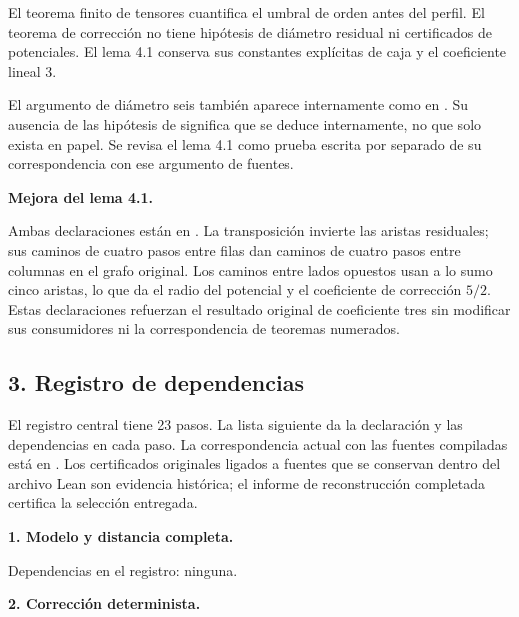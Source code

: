 \documentclass[spanish,11pt,a4paper]{article}
\begin{document}
El teorema finito de tensores cuantifica el umbral de orden antes del perfil. El teorema de corrección no tiene hipótesis de diámetro residual ni certificados de potenciales. El lema 4.1 conserva sus constantes explícitas de caja y el coeficiente lineal 3.

El argumento de diámetro seis también aparece internamente como  en . Su ausencia de las hipótesis de  significa que se deduce internamente, no que solo exista en papel. Se revisa el lema 4.1 como prueba escrita por separado de su correspondencia con ese argumento de fuentes.

\textbf{Mejora del lema 4.1.}



Ambas declaraciones están en . La transposición invierte las aristas residuales; sus caminos de cuatro pasos entre filas dan caminos de cuatro pasos entre columnas en el grafo original. Los caminos entre lados opuestos usan a lo sumo cinco aristas, lo que da el radio del potencial y el coeficiente de corrección \(5/2\). Estas declaraciones refuerzan el resultado original de coeficiente tres sin modificar sus consumidores ni la correspondencia de teoremas numerados.

\subsection{3. Registro de dependencias}\label{registro-de-dependencias}

El registro central tiene 23 pasos. La lista siguiente da la declaración y las dependencias en cada paso. La correspondencia actual con las fuentes compiladas está en . Los certificados originales ligados a fuentes que se conservan dentro del archivo Lean son evidencia histórica; el informe de reconstrucción completada certifica la selección entregada.

\textbf{1. Modelo y distancia completa.}


Dependencias en el registro: ninguna.

\textbf{2. Corrección determinista.}

\end{document}
